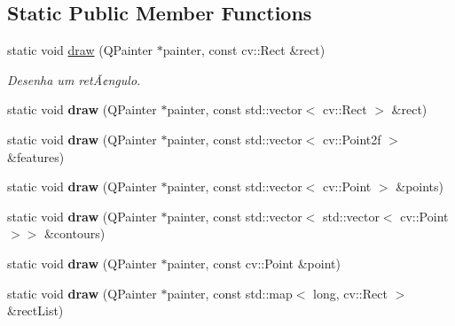 \subsection*{Static Public Member Functions}
\begin{DoxyCompactItemize}
\item 
\hypertarget{class_image_viewer_cv_a5caa5d40351ec19addf9d3a4a084dc0b}{}static void \hyperlink{class_image_viewer_cv_a5caa5d40351ec19addf9d3a4a084dc0b}{draw} (Q\+Painter $\ast$painter, const cv\+::\+Rect \&rect)\label{class_image_viewer_cv_a5caa5d40351ec19addf9d3a4a084dc0b}

\begin{DoxyCompactList}\small\item\em Desenha um retÃ¢ngulo. \end{DoxyCompactList}\item 
\hypertarget{class_image_viewer_cv_a6d8036d40e3757098324729c170c3dd8}{}static void {\bfseries draw} (Q\+Painter $\ast$painter, const std\+::vector$<$ cv\+::\+Rect $>$ \&rect)\label{class_image_viewer_cv_a6d8036d40e3757098324729c170c3dd8}

\item 
\hypertarget{class_image_viewer_cv_afddebc4ae3cf50b81bb8e65349ce80a6}{}static void {\bfseries draw} (Q\+Painter $\ast$painter, const std\+::vector$<$ cv\+::\+Point2f $>$ \&features)\label{class_image_viewer_cv_afddebc4ae3cf50b81bb8e65349ce80a6}

\item 
\hypertarget{class_image_viewer_cv_a84e2ab1cc09031e99815dd1f7d6f8e2a}{}static void {\bfseries draw} (Q\+Painter $\ast$painter, const std\+::vector$<$ cv\+::\+Point $>$ \&points)\label{class_image_viewer_cv_a84e2ab1cc09031e99815dd1f7d6f8e2a}

\item 
\hypertarget{class_image_viewer_cv_a61de4cc1c53f594fbff5fb62ee94cca4}{}static void {\bfseries draw} (Q\+Painter $\ast$painter, const std\+::vector$<$ std\+::vector$<$ cv\+::\+Point $>$$>$ \&contours)\label{class_image_viewer_cv_a61de4cc1c53f594fbff5fb62ee94cca4}

\item 
\hypertarget{class_image_viewer_cv_ac14744093f0ef265ef9eb0b533cc2c29}{}static void {\bfseries draw} (Q\+Painter $\ast$painter, const cv\+::\+Point \&point)\label{class_image_viewer_cv_ac14744093f0ef265ef9eb0b533cc2c29}

\item 
\hypertarget{class_image_viewer_cv_a3f50e27fec271697691ec5e49a061e36}{}static void {\bfseries draw} (Q\+Painter $\ast$painter, const std\+::map$<$ long, cv\+::\+Rect $>$ \&rect\+List)\label{class_image_viewer_cv_a3f50e27fec271697691ec5e49a061e36}


\end{DoxyCompactItemize}
